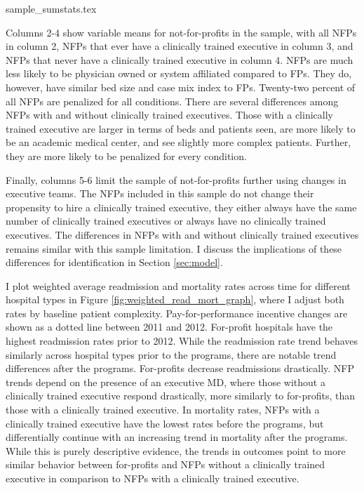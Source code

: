 \documentclass[12pt]{article}
\begin{document}
    {sample_sumstats.tex}

    Columns 2-4 show variable means for not-for-profits in the sample, with all NFPs in column 2, NFPs that ever have a clinically trained executive in column 3, and NFPs that never have a clinically trained executive in column 4. NFPs are much less likely to be physician owned or system affiliated compared to FPs. They do, however, have similar bed size and case mix index to FPs. Twenty-two percent of all NFPs are penalized for all conditions. There are several differences among NFPs with and without clinically trained executives. Those with a clinically trained executive are larger in terms of beds and patients seen, are more likely to be an academic medical center, and see slightly more complex patients. Further, they are more likely to be penalized for every condition. 

    Finally, columns 5-6 limit the sample of not-for-profits further using changes in executive teams. The NFPs included in this sample do not change their propensity to hire a clinically trained executive, they either always have the same number of clinically trained executives or always have no clinically trained executives. The differences in NFPs with and without clinically trained executives remains similar with this sample limitation. I discuss the implications of these differences for identification in Section \ref{sec:model}. 

    I plot weighted average readmission and mortality rates across time for different hospital types in Figure \ref{fig:weighted_read_mort_graph}, where I adjust both rates by baseline patient complexity. Pay-for-performance incentive changes are shown as a dotted line between 2011 and 2012. For-profit hospitals have the highest readmission rates prior to 2012. While the readmission rate trend behaves similarly across hospital types prior to the programs, there are notable trend differences after the programs. For-profits decrease readmissions drastically. NFP trends depend on the presence of an executive MD, where those without a clinically trained executive respond drastically, more similarly to for-profits, than those with a clinically trained executive. In mortality rates, NFPs with a clinically trained executive have the lowest rates before the programs, but differentially continue with an increasing trend in mortality after the programs. While this is purely descriptive evidence, the trends in outcomes point to more similar behavior between for-profits and NFPs without a clinically trained executive in comparison to NFPs with a clinically trained executive.
\end{document}
